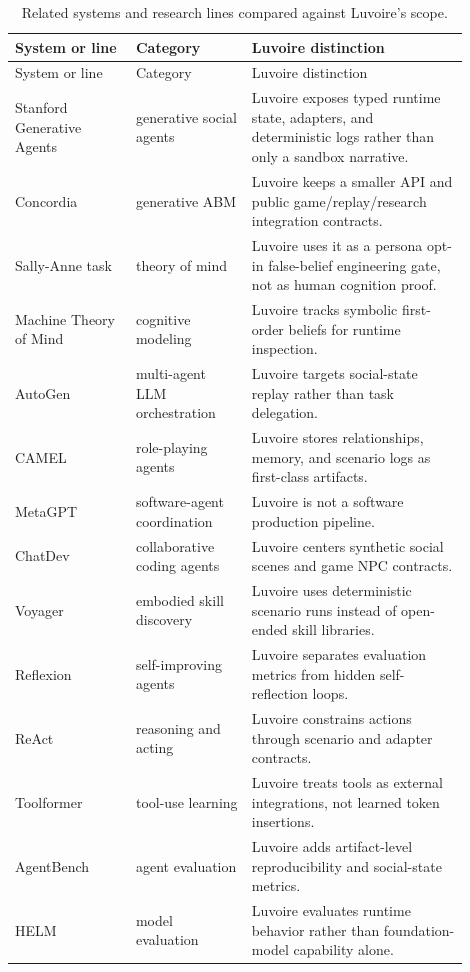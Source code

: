 \begin{longtable}{p{0.24\linewidth}p{0.23\linewidth}p{0.43\linewidth}}
\caption{Related systems and research lines compared against Luvoire's scope.}\label{tab:related-comparison-map}\\
\toprule
System or line & Category & Luvoire distinction \\
\midrule
\endfirsthead
\toprule
System or line & Category & Luvoire distinction \\
\midrule
\endhead
Stanford Generative Agents & generative social agents & Luvoire exposes typed runtime state, adapters, and deterministic logs rather than only a sandbox narrative. \\
Concordia & generative ABM & Luvoire keeps a smaller API and public game/replay/research integration contracts. \\
Sally-Anne task & theory of mind & Luvoire uses it as a persona opt-in false-belief engineering gate, not as human cognition proof. \\
Machine Theory of Mind & cognitive modeling & Luvoire tracks symbolic first-order beliefs for runtime inspection. \\
AutoGen & multi-agent LLM orchestration & Luvoire targets social-state replay rather than task delegation. \\
CAMEL & role-playing agents & Luvoire stores relationships, memory, and scenario logs as first-class artifacts. \\
MetaGPT & software-agent coordination & Luvoire is not a software production pipeline. \\
ChatDev & collaborative coding agents & Luvoire centers synthetic social scenes and game NPC contracts. \\
Voyager & embodied skill discovery & Luvoire uses deterministic scenario runs instead of open-ended skill libraries. \\
Reflexion & self-improving agents & Luvoire separates evaluation metrics from hidden self-reflection loops. \\
ReAct & reasoning and acting & Luvoire constrains actions through scenario and adapter contracts. \\
Toolformer & tool-use learning & Luvoire treats tools as external integrations, not learned token insertions. \\
AgentBench & agent evaluation & Luvoire adds artifact-level reproducibility and social-state metrics. \\
HELM & model evaluation & Luvoire evaluates runtime behavior rather than foundation-model capability alone. \\

\end{longtable}
